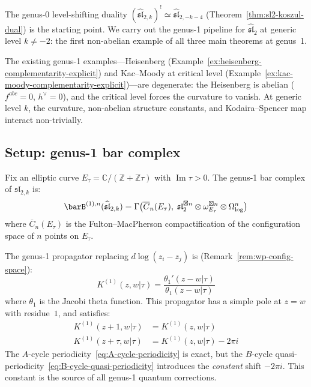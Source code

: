 The genus-0 level-shifting duality $(\widehat{\mathfrak{sl}}_{2,k})^! \simeq \widehat{\mathfrak{sl}}_{2,-k-4}$ (Theorem~\ref{thm:sl2-koszul-dual}) is the starting point.  We carry out the genus-1 pipeline for $\widehat{\mathfrak{sl}}_2$ at generic level $k \neq -2$: the first non-abelian example of all three main theorems at genus~1.

The existing genus-1 examples---Heisenberg (Example~\ref{ex:heisenberg-complementarity-explicit}) and Kac--Moody at critical level (Example~\ref{ex:kac-moody-complementarity-explicit})---are degenerate: the Heisenberg is abelian ($f^{abc}=0$, $h^\vee=0$), and the critical level forces the curvature to vanish.  At generic level $k$, the curvature, non-abelian structure constants, and Kodaira--Spencer map interact non-trivially.

\subsection{Setup: genus-1 bar complex}

Fix an elliptic curve $E_\tau = \mathbb{C}/(\mathbb{Z}+\mathbb{Z}\tau)$ with $\operatorname{Im}\tau>0$.  The genus-1 bar complex of $\widehat{\mathfrak{sl}}_{2,k}$ is:
\begin{equation}\label{eq:sl2-genus1-bar}
\barB^{(1),n}(\widehat{\mathfrak{sl}}_{2,k}) = \Gamma\bigl(\overline{C}_n(E_\tau),\; \mathfrak{sl}_2^{\boxtimes n} \otimes \omega_{E_\tau}^{\boxtimes n} \otimes \Omega^n_{\log}\bigr)
\end{equation}
where $\overline{C}_n(E_\tau)$ is the Fulton--MacPherson compactification of the configuration space of $n$ points on $E_\tau$.

The genus-1 propagator replacing $d\log(z_i - z_j)$ is (Remark~\ref{rem:wp-config-space}):
\begin{equation}\label{eq:genus1-propagator}
K^{(1)}(z,w|\tau) = \frac{\theta_1'(z-w|\tau)}{\theta_1(z-w|\tau)}
\end{equation}
where $\theta_1$ is the Jacobi theta function.  This propagator has a simple pole at $z=w$ with residue~$1$, and satisfies:
\begin{align}
K^{(1)}(z+1,w|\tau) &= K^{(1)}(z,w|\tau) \label{eq:A-cycle-periodicity} \\
K^{(1)}(z+\tau,w|\tau) &= K^{(1)}(z,w|\tau) - 2\pi i \label{eq:B-cycle-quasi-periodicity}
\end{align}
The $A$-cycle periodicity~\eqref{eq:A-cycle-periodicity} is exact, but the $B$-cycle quasi-periodicity~\eqref{eq:B-cycle-quasi-periodicity} introduces the \emph{constant} shift $-2\pi i$.  This constant is the source of all genus-1 quantum corrections.


